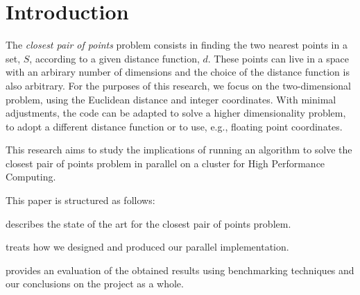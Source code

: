 \section{Introduction}
\label{sec:introduction}

The \textit{closest pair of points} problem consists
in finding the two nearest points in a set, $S$, according to a given distance function, $d$\cite{closest_pair_definition}.
These points can live in a space with an arbirary number of dimensions
and the choice of the distance function is also arbitrary.
For the purposes of this research, we focus on the two-dimensional problem, using the Euclidean distance and integer coordinates.
With minimal adjustments, the code can be adapted to solve a higher dimensionality problem, to adopt a different distance function or to use, e.g., floating point coordinates.

This research aims to study the implications of running an algorithm to solve the closest pair of points problem in parallel on a cluster for High Performance Computing.

This paper is structured as follows:
\begin{inlinelist}
    \item {} describes the state of the art for the closest pair of points problem.
    \item {} treats how we designed and produced our parallel implementation.
    \item {} provides an evaluation of the obtained results using benchmarking techniques and our conclusions on the project as a whole.
\end{inlinelist}
